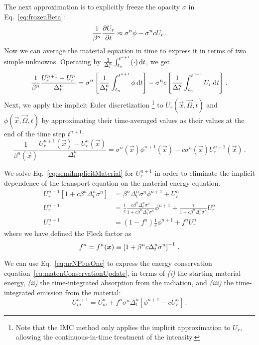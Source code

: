 The next approximation is to explicitly freeze the opacity $\sigma$ in
Eq.~\eqref{eq:frozenBeta}:
\begin{equation*}
  \frac{1}{\beta^n}
  \frac{\partial U_r}{\partial t} \approx \sigma^n \phi - \sigma^n c U_r \,.
\end{equation*}
Now we can average the material equation in time to express it in terms of two
simple unknowns. Operating by
$\frac{1}{\Delta_t^n}\int_{t_n}^{t^{n+1}} (\cdot) \mathop{}\!\mathrm{d} t$,
we get
\begin{equation*}
  \frac{1}{\beta^n}
  \frac{U_r^{n+1} - U_r^n}{\Delta_t^n} = \sigma^n \left[
  \frac{1}{\Delta_t^n}\int_{t_n}^{t^{n+1}} \phi \mathop{}\!\mathrm{d} t
  \right] - \sigma^n c \left[
  \frac{1}{\Delta_t^n}\int_{t_n}^{t^{n+1}} U_r \mathop{}\!\mathrm{d} t \right]\,.
\end{equation*}
Next, we apply the implicit Euler discretization%
\footnote{Note that the IMC method only applies the implicit approximation to
$U_r$, allowing the continuous-in-time treatment of the intensity.}
to $U_r(\vec{x}, \vec{\Omega}, t)$ and $\phi(\vec{x}, \vec{\Omega}, t)$ by
approximating their time-averaged values as their values at the end of the time
step $t^{n+1}$:
\begin{equation} \label{eq:semiImplicitMaterial}
  \frac{1}{\beta^n(\vec{x})}
  \frac{U_r^{n+1}(\vec{x}) - U_r^n(\vec{x})}{\Delta_t^n}
  = \sigma^n(\vec{x}) \phi^{n+1}(\vec{x})
  - c \sigma^n(\vec{x}) U_r^{n+1}(\vec{x}) \,.
\end{equation}

We solve Eq.~\eqref{eq:semiImplicitMaterial} for $U_r^{n+1}$ in order to
eliminate the implicit dependence of the transport equation on the material
energy equation.
\begin{align} \nonumber
  U_r^{n+1} [ 1 + c \beta^n \Delta_t^n \sigma^n ]
  &= \beta^n \Delta_t^n \sigma^n\phi^{n+1} + U_r^n
   \\ \nonumber
  U_r^{n+1}
  &= \frac1c \frac{ c \beta^n \Delta_t^n \sigma^n }{ 1 + c \beta^n \Delta_t^n \sigma^n}
  \phi^{n+1} + \frac1{ 1 + c \beta^n \Delta_t^n \sigma^n}
  U_r^n
  \\ \label{eq:urNPlusOne}
  U_r^{n+1}
  &= \left(1 - f^n\right) \frac1c \phi^{n+1} + f^n U_r^n
\end{align}
where we have defined the Fleck factor \cite{Fle1971} as
\begin{equation} \label{eq:fleckFactor}
  f^n = f^n(\bm{x}) \equiv \left[ 1 + \beta^n c \Delta_t^n \sigma^n
  \right]^{-1} \,.
\end{equation}

We can use Eq.~\eqref{eq:urNPlusOne} to express the energy conservation
equation~\eqref{eq:matenConservationUpdate}, in terms of \textsl{(i)} the starting
material energy, \textsl{(ii)} the time-integrated absorption from the radiation, and
\textsl{(iii)} the time-integrated emission from the material:
\begin{equation}\label{eq:matenConservationUpdate2}
  U_m^{n+1} = U_m^n + f^n \sigma^n \Delta_t^n
  \left[ \phi^{n+1} - c U_r^n \right] \,.
\end{equation}

